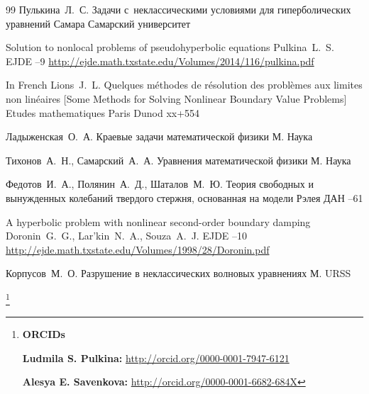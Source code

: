 \begin{thebibliography}{99}
\by Пулькина~Л.~С.
\book Задачи с~неклассическими условиями для гиперболических уравнений
\publaddr Самара
\publ Самарский университет


\paper Solution to nonlocal problems of pseudohyperbolic  equations
\by    Pulkina~L.~S.
\jour  EJDE
--9
\elink \url{http://ejde.math.txstate.edu/Volumes/2014/116/pulkina.pdf}



\lang In French
\by Lions~J.~L.
\book Quelques m\'ethodes de r\'esolution des probl\`emes aux limites non lin\'eaires \rm [Some Methods for Solving Nonlinear Boundary Value Problems]
\serial Etudes mathematiques
\publaddr Paris
\publ Dunod 
\totalpages xx+554 

\by Ладыженская~О.~А.
\book Краевые задачи математической физики
\publaddr М.
\publ Наука

\by Тихонов~А.~Н., Самарский~А.~А.
\book Уравнения математической физики
\publaddr М.
\publ Наука


\by Федотов~И.~А., Полянин~А.~Д., Шаталов~М.~Ю.
\paper Теория свободных и вынужденных колебаний твердого стержня, основанная на модели Рэлея
\jour ДАН
--61


\paper  A hyperbolic problem with nonlinear second-order boundary damping
\by   Doronin~G.~G., Lar'kin~N.~A., Souza~A.~J.
\jour  EJDE
--10
\elink \url{http://ejde.math.txstate.edu/Volumes/1998/28/Doronin.pdf}

\by Корпусов~М.~О.
\book Разрушение в неклассических волновых уравнениях
\publaddr М.
\publ URSS

\end{thebibliography}

\RuDate


\newpage

\makeentitle

\smallskip

\thanks{{\bf ORCIDs}

{\bf Ludmila S. Pulkina:} \url{http://orcid.org/0000-0001-7947-6121}

{\bf Alesya E. Savenkova:} \url{http://orcid.org/0000-0001-6682-684X}

}

